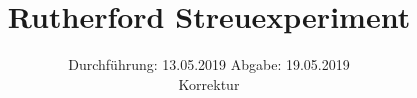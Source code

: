

\subject{V16}
\title{Rutherford Streuexperiment}
\date{%
  Durchführung: 13.05.2019
  \hspace{3em}
  Abgabe: 19.05.2019\\
  Korrektur
}



\maketitle
\thispagestyle{empty}
\tableofcontents
\newpage






\printbibliography{}


